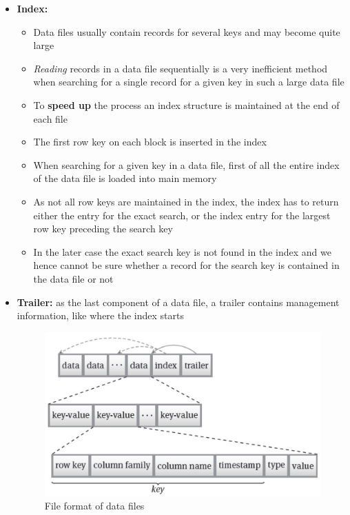 \begin{itemize}
    \item \textbf{Index:}
    \begin{itemize}
        \item Data files usually contain records for several keys and may become quite large
        \item \textit{Reading} records in a data file sequentially is a very inefficient method when searching for a single record for a given key in such a large data file
        \item To \textbf{speed up} the process an index structure is maintained at the end of each file
        \item The first row key on each block is inserted in the index
        \item When searching for a given key in a data file, first of all the entire index of the data file is loaded into main memory
        \item As not all row keys are maintained in the index, the index has to return either the entry for the exact search, or the index entry for the largest row key preceding the search key
        \item In the later case the exact search key is not found in the index and we hence cannot be sure whether a record for the search key is contained in the data file or not
    \end{itemize}
    \item \textbf{Trailer:} as the last component of a data file, a trailer contains management information, like where the index starts
    
    \begin{figure}[!hbp]
    \centering
    \includegraphics[width=0.50\linewidth]{images/AdvancedDataManagment/extensible_record_store/file_format.jpeg}
    \caption{File format of data files}
\end{figure}
    

\end{itemize}
